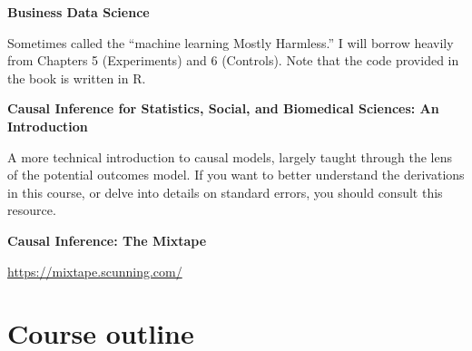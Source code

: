 \documentclass[11 pt]{article}
\begin{document}
\textbf{Business Data Science} \parencite{T19}
\begin{blist}
\item Sometimes called the ``machine learning Mostly Harmless.'' I will borrow heavily from Chapters 5 (Experiments) and 6 (Controls). Note that the code provided in the book is written in R. 
\end{blist}

\textbf{Causal Inference for Statistics, Social, and Biomedical Sciences: An Introduction} \parencite{IR15}
\begin{blist}
\item A more technical introduction to causal models, largely taught through the lens of the potential outcomes model. If you want to better understand the derivations in this course, or delve into details on standard errors, you should consult this resource.
\end{blist}

\textbf{Causal Inference: The Mixtape} \parencite{C25}
\begin{blist}
\item \url{https://mixtape.scunning.com/}
\end{blist}
\section*{Course outline}
\end{document}

